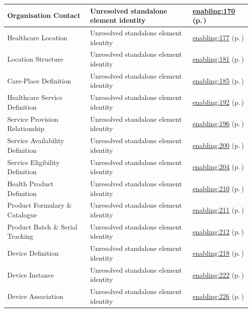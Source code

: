 \begin{longtable}{|>{\raggedright\arraybackslash}p{0.38\TableWidth}|>{\raggedright\arraybackslash}p{0.27\TableWidth}|>{\raggedright\arraybackslash}p{0.35\TableWidth}|}
Organisation Contact & Unresolved standalone element identity & \hyperref[rad:enabling:161]{enabling:170} (p.\,\pageref{rad:enabling:161})\\\hline
Healthcare Location & Unresolved standalone element identity & \hyperref[rad:enabling:177]{enabling:177} (p.\,\pageref{rad:enabling:177})\\\hline
Location Structure & Unresolved standalone element identity & \hyperref[rad:enabling:177]{enabling:181} (p.\,\pageref{rad:enabling:177})\\\hline
Care-Place Definition & Unresolved standalone element identity & \hyperref[rad:enabling:177]{enabling:185} (p.\,\pageref{rad:enabling:177})\\\hline
Healthcare Service Definition & Unresolved standalone element identity & \hyperref[rad:enabling:192]{enabling:192} (p.\,\pageref{rad:enabling:192})\\\hline
Service Provision Relationship & Unresolved standalone element identity & \hyperref[rad:enabling:192]{enabling:196} (p.\,\pageref{rad:enabling:192})\\\hline
Service Availability Definition & Unresolved standalone element identity & \hyperref[rad:enabling:192]{enabling:200} (p.\,\pageref{rad:enabling:192})\\\hline
Service Eligibility Definition & Unresolved standalone element identity & \hyperref[rad:enabling:192]{enabling:204} (p.\,\pageref{rad:enabling:192})\\\hline
Health Product Definition & Unresolved standalone element identity & \hyperref[rad:enabling:210]{enabling:210} (p.\,\pageref{rad:enabling:210})\\\hline
Product Formulary \& Catalogue & Unresolved standalone element identity & \hyperref[rad:enabling:210]{enabling:211} (p.\,\pageref{rad:enabling:210})\\\hline
Product Batch \& Serial Tracking & Unresolved standalone element identity & \hyperref[rad:enabling:210]{enabling:212} (p.\,\pageref{rad:enabling:210})\\\hline
Device Definition & Unresolved standalone element identity & \hyperref[rad:enabling:218]{enabling:218} (p.\,\pageref{rad:enabling:218})\\\hline
Device Instance & Unresolved standalone element identity & \hyperref[rad:enabling:218]{enabling:222} (p.\,\pageref{rad:enabling:218})\\\hline
Device Association & Unresolved standalone element identity & \hyperref[rad:enabling:218]{enabling:226} (p.\,\pageref{rad:enabling:218})\\\hline

\end{longtable}
